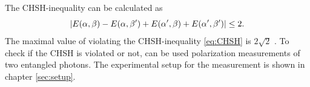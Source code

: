 The CHSH-inequality can be calculated \cite{barz} as
\begin{equation}
\abs{E(\alpha,\beta)-E(\alpha,\beta')+E(\alpha',\beta)+E(\alpha',\beta')} \leq 2.
\label{eq:CHSH}
\end{equation}
The maximal value of violating the CHSH-inequality \eqref{eq:CHSH} is $2\sqrt{2}$ \cite{barz}.
To check  if the CHSH is violated or not, can be used polarization measurements of two entangled photons. 
The experimental setup for the measurement is shown in chapter \ref{sec:setup}. 








